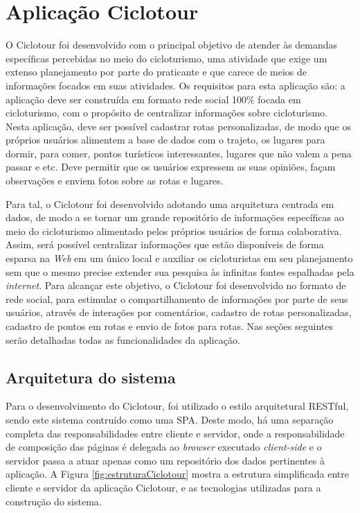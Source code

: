 \section{\esp Aplicação Ciclotour}
O Ciclotour foi desenvolvido com o principal objetivo de atender às demandas específicas percebidas no meio do cicloturismo, uma atividade que exige
um extenso planejamento por parte do praticante e que carece de meios de informações focados em suas atividades. Os requisitos para esta aplicação
são: a aplicação deve ser construída em formato rede social 100\% focada em cicloturismo, com o propósito de centralizar informações sobre 
cicloturismo. Nesta aplicação, deve ser possível cadastrar rotas personalizadas, de modo que os próprios usuários alimentem a base de dados com 
o trajeto, os lugares para dormir, para comer, pontos turísticos interessantes, lugares que não valem a pena passar e etc. Deve permitir que 
os usuários expressem as suas opiniões, façam observações e enviem fotos sobre as rotas e lugares.

Para tal, o Ciclotour foi desenvolvido adotando uma arquitetura centrada em dados, de modo a se tornar um grande repositório de informações 
específicas ao meio do cicloturismo alimentado pelos próprios usuários de forma colaborativa. Assim, será possível centralizar informações que 
estão disponíveis de forma esparsa na \textit{Web} em um único local e auxiliar os cicloturistas em seu planejamento sem que 
o mesmo precise extender sua pesquisa às infinitas fontes espalhadas pela \textit{internet}. Para alcançar este objetivo, o Ciclotour 
foi desenvolvido no formato de rede social, para 
estimular o compartilhamento de informações por parte de seus usuários, através de interações por comentários, cadastro de rotas personalizadas, 
cadastro de pontos em rotas e envio de fotos para rotas. Nas seções seguintes serão detalhadas todas as funcionalidades da aplicação.

\subsection{Arquitetura do sistema}
Para o desenvolvimento do Ciclotour, foi utilizado o estilo arquitetural RESTful, sendo este sistema contruído como uma SPA. Deste modo, há
uma separação completa das responsabilidades entre cliente e servidor, onde a responsabilidade de composição das páginas é delegada ao 
\textit{browser} executado \textit{client-side} e o servidor passa a atuar apenas como um repositório dos dados pertinentes à aplicação. A Figura 
\ref{fig:estruturaCiclotour} mostra a estrutura simplificada entre cliente e servidor da aplicação Ciclotour, e as tecnologias utilizadas para
a construção do sistema.

